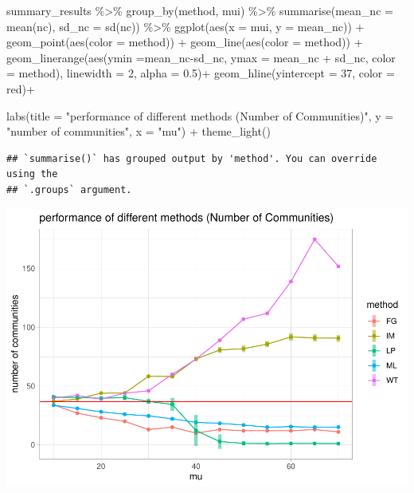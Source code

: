 \documentclass[
]{article}
\newenvironment{Shaded}{\begin{snugshade}}{\end{snugshade}}
\newcommand{\AttributeTok}[1]{\textcolor[rgb]{0.77,0.63,0.00}{#1}}
\newcommand{\DecValTok}[1]{\textcolor[rgb]{0.00,0.00,0.81}{#1}}
\newcommand{\FloatTok}[1]{\textcolor[rgb]{0.00,0.00,0.81}{#1}}
\newcommand{\FunctionTok}[1]{\textcolor[rgb]{0.00,0.00,0.00}{#1}}
\newcommand{\NormalTok}[1]{#1}
\newcommand{\SpecialCharTok}[1]{\textcolor[rgb]{0.00,0.00,0.00}{#1}}
\newcommand{\StringTok}[1]{\textcolor[rgb]{0.31,0.60,0.02}{#1}}
\begin{document}
\begin{Shaded}
\begin{Highlighting}[]
\NormalTok{summary\_results }\SpecialCharTok{\%\textgreater{}\%} 
    \FunctionTok{group\_by}\NormalTok{(method, mui) }\SpecialCharTok{\%\textgreater{}\%} 
    \FunctionTok{summarise}\NormalTok{(}\AttributeTok{mean\_nc =} \FunctionTok{mean}\NormalTok{(nc), }\AttributeTok{sd\_nc =} \FunctionTok{sd}\NormalTok{(nc)) }\SpecialCharTok{\%\textgreater{}\%}
    \FunctionTok{ggplot}\NormalTok{(}\FunctionTok{aes}\NormalTok{(}\AttributeTok{x =}\NormalTok{ mui, }\AttributeTok{y =}\NormalTok{ mean\_nc)) }\SpecialCharTok{+}
    \FunctionTok{geom\_point}\NormalTok{(}\FunctionTok{aes}\NormalTok{(}\AttributeTok{color =}\NormalTok{ method)) }\SpecialCharTok{+}
    \FunctionTok{geom\_line}\NormalTok{(}\FunctionTok{aes}\NormalTok{(}\AttributeTok{color =}\NormalTok{ method)) }\SpecialCharTok{+}
    \FunctionTok{geom\_linerange}\NormalTok{(}\FunctionTok{aes}\NormalTok{(}\AttributeTok{ymin =}\NormalTok{mean\_nc}\SpecialCharTok{{-}}\NormalTok{sd\_nc, }\AttributeTok{ymax =}\NormalTok{ mean\_nc }\SpecialCharTok{+}\NormalTok{ sd\_nc, }\AttributeTok{color =}\NormalTok{ method), }\AttributeTok{linewidth =} \DecValTok{2}\NormalTok{, }\AttributeTok{alpha =} \FloatTok{0.5}\NormalTok{)}\SpecialCharTok{+}
    \FunctionTok{geom\_hline}\NormalTok{(}\AttributeTok{yintercept =} \DecValTok{37}\NormalTok{, }\AttributeTok{color =} \StringTok{\textquotesingle{}red\textquotesingle{}}\NormalTok{)}\SpecialCharTok{+}

    \FunctionTok{labs}\NormalTok{(}\AttributeTok{title =} \StringTok{"performance of different methods (Number of Communities)"}\NormalTok{, }\AttributeTok{y =} \StringTok{"number of communities"}\NormalTok{, }\AttributeTok{x =} \StringTok{"mu"}\NormalTok{) }\SpecialCharTok{+}
    \FunctionTok{theme\_light}\NormalTok{()    }
\end{Highlighting}
\end{Shaded}

\begin{verbatim}
## `summarise()` has grouped output by 'method'. You can override using the
## `.groups` argument.
\end{verbatim}

\includegraphics{com_det_algorithms_files/figure-latex/unnamed-chunk-23-1.pdf}
\end{document}
